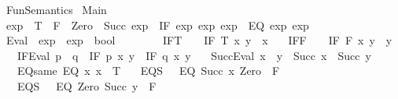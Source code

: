 %
\begin{isabellebody}%
%
%
\isadelimtheory
%
\endisadelimtheory
%
\isatagtheory
{}\isamarkupfalse%
\ Fun{\isacharunderscore}{\kern0pt}Semantics\isanewline
{}\ Main\isanewline
{}%
\endisatagtheory
{\isafoldtheory}%
%
\isadelimtheory
\isanewline
%
\endisadelimtheory
\isanewline
{}\isamarkupfalse%
\ exp\ {\isacharequal}{\kern0pt}\ T\ {\isacharbar}{\kern0pt}\ F\ {\isacharbar}{\kern0pt}\ Zero\ {\isacharbar}{\kern0pt}\ Succ\ exp\ {\isacharbar}{\kern0pt}\ IF\ exp\ exp\ exp\ {\isacharbar}{\kern0pt}\ EQ\ exp\ exp\isanewline
\isanewline
{}\isamarkupfalse%
\ Eval\ {\isacharcolon}{\kern0pt}{\isacharcolon}{\kern0pt}\ {\isachardoublequoteopen}exp\ {\isasymRightarrow}\ exp\ {\isasymRightarrow}\ bool{\isachardoublequoteclose}\ {\isacharparenleft}{\kern0pt}\ {\isachardoublequoteopen}{\isasymRrightarrow}{\isachardoublequoteclose}\ {}{}{\isacharparenright}{\kern0pt}\ \isanewline
\ \ \ \ IF{\isacharunderscore}{\kern0pt}T{\isacharcolon}{\kern0pt}\ \ \ \ {\isachardoublequoteopen}IF\ T\ x\ y\ {\isasymRrightarrow}\ x{\isachardoublequoteclose}\isanewline
\ \ {\isacharbar}{\kern0pt}\ IF{\isacharunderscore}{\kern0pt}F{\isacharcolon}{\kern0pt}\ \ \ \ {\isachardoublequoteopen}IF\ F\ x\ y\ {\isasymRrightarrow}\ y{\isachardoublequoteclose}\isanewline
\ \ {\isacharbar}{\kern0pt}\ IF{\isacharunderscore}{\kern0pt}Eval{\isacharcolon}{\kern0pt}\ {\isachardoublequoteopen}p\ {\isasymRrightarrow}\ q\ {\isasymLongrightarrow}\ IF\ p\ x\ y\ {\isasymRrightarrow}\ IF\ q\ x\ y{\isachardoublequoteclose}\isanewline
\ \ {\isacharbar}{\kern0pt}\ Succ{\isacharunderscore}{\kern0pt}Eval{\isacharcolon}{\kern0pt}\ {\isachardoublequoteopen}x\ {\isasymRrightarrow}\ y\ {\isasymLongrightarrow}\ Succ\ x\ {\isasymRrightarrow}\ Succ\ y{\isachardoublequoteclose}\isanewline
\ \ {\isacharbar}{\kern0pt}\ EQ{\isacharunderscore}{\kern0pt}same{\isacharcolon}{\kern0pt}\ {\isachardoublequoteopen}EQ\ x\ x\ {\isasymRrightarrow}\ T{\isachardoublequoteclose}\isanewline
\ \ {\isacharbar}{\kern0pt}\ EQ{\isacharunderscore}{\kern0pt}S{}{\isacharcolon}{\kern0pt}\ \ \ {\isachardoublequoteopen}EQ\ {\isacharparenleft}{\kern0pt}Succ\ x{\isacharparenright}{\kern0pt}\ Zero\ {\isasymRrightarrow}\ F{\isachardoublequoteclose}\isanewline
\ \ {\isacharbar}{\kern0pt}\ EQ{\isacharunderscore}{\kern0pt}{}S{\isacharcolon}{\kern0pt}\ \ \ {\isachardoublequoteopen}EQ\ Zero\ {\isacharparenleft}{\kern0pt}Succ\ y{\isacharparenright}{\kern0pt}\ {\isasymRrightarrow}\ F{\isachardoublequoteclose}\isanewline

\end{isabellebody}
